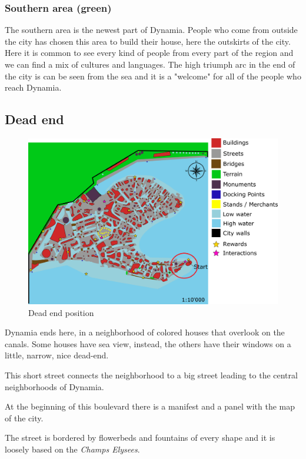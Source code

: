 \subsubsection{Southern area (green)}
The southern area is the newest part of Dynamia. People who come from outside the city has chosen this area to build their house, here the outskirts of the city. Here it is common to see every kind of people from every part of the region and we can find a mix of cultures and languages. The high triumph arc in the end of the city is can be seen from the sea and it is a "welcome" for all of the people who reach Dynamia. 

\subsection{Dead end}
\begin{figure}[H]
  \centering
  \includegraphics[width=\textwidth]{Images/Maps/dynamia_deadEnd}
  \caption{Dead end position}
\end{figure}

Dynamia ends here, in a neighborhood of colored houses that overlook on the canals. Some houses have sea view, instead, the others have their windows on a little, narrow, nice dead-end.

This short street connects the neighborhood to a big street leading to the central neighborhoods of Dynamia.

At the beginning of this boulevard there is a manifest and a panel with the map of the city.

The street is bordered by flowerbeds and fountains of every shape and it is loosely based on the \textit{Champs Elysees}.

